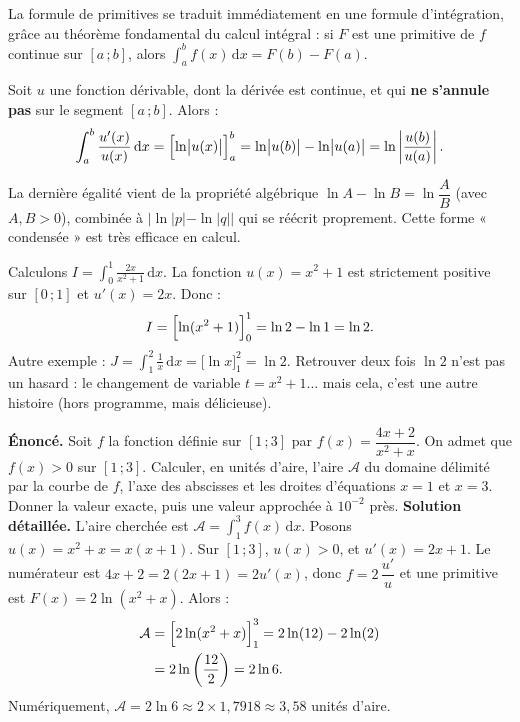 \documentclass[11pt]{article}
\newcounter{popsec}
\newcounter{popsub}
\newcommand{\courssub}[1]{%
  \stepcounter{popsub}%
  \par\vspace{9pt}\noindent{\popxbold\fontsize{11.5}{13}\selectfont\color{popink}{\color{poporange}\thepopsec.\thepopsub}\hspace{6pt}#1}\par\nopagebreak\vspace{4pt}
}
\begin{document}
\courssub{Lien avec le calcul intégral}

La formule de primitives se traduit immédiatement en une formule d'intégration, grâce au théorème fondamental du calcul intégral : si $F$ est une primitive de $f$ continue sur $[a\,;b]$, alors $\displaystyle\int_a^b f(x)\,\mathrm{d}x = F(b) - F(a)$.

\begin{propriete}[Intégrale de $u'/u$]
Soit $u$ une fonction dérivable, dont la dérivée est continue, et qui \textbf{ne s'annule pas} sur le segment $[a\,;b]$. Alors :
\[ \int_a^b \frac{u'(x)}{u(x)}\,\mathrm{d}x = \Bigl[\ln\bigl|u(x)\bigr|\Bigr]_a^b = \ln\bigl|u(b)\bigr| - \ln\bigl|u(a)\bigr| = \ln\left|\frac{u(b)}{u(a)}\right|. \]
\end{propriete}

La dernière égalité vient de la propriété algébrique $\ln A - \ln B = \ln\dfrac{A}{B}$ (avec $A, B > 0$), combinée à $|\ln|p| - \ln|q||$ qui se réécrit proprement. Cette forme « condensée » est très efficace en calcul.

\begin{exemplebox}
Calculons $I = \displaystyle\int_0^1 \frac{2x}{x^2 + 1}\,\mathrm{d}x$.
La fonction $u(x) = x^2 + 1$ est strictement positive sur $[0\,;1]$ et $u'(x) = 2x$. Donc :
\[ I = \Bigl[\ln(x^2+1)\Bigr]_0^1 = \ln 2 - \ln 1 = \ln 2. \]
Autre exemple : $J = \displaystyle\int_1^2 \frac{1}{x}\,\mathrm{d}x = \bigl[\ln x\bigr]_1^2 = \ln 2$. Retrouver deux fois $\ln 2$ n'est pas un hasard : le changement de variable $t = x^2 + 1$... mais cela, c'est une autre histoire (hors programme, mais délicieuse).
\end{exemplebox}

\begin{exoresolu}
\textbf{Énoncé.} Soit $f$ la fonction définie sur $[1\,;3]$ par $f(x) = \dfrac{4x + 2}{x^2 + x}$. On admet que $f(x) > 0$ sur $[1\,;3]$. Calculer, en unités d'aire, l'aire $\mathcal{A}$ du domaine délimité par la courbe de $f$, l'axe des abscisses et les droites d'équations $x = 1$ et $x = 3$. Donner la valeur exacte, puis une valeur approchée à $10^{-2}$ près.
\tcblower
\textbf{Solution détaillée.} L'aire cherchée est $\mathcal{A} = \displaystyle\int_1^3 f(x)\,\mathrm{d}x$.
Posons $u(x) = x^2 + x = x(x+1)$. Sur $[1\,;3]$, $u(x) > 0$, et $u'(x) = 2x + 1$. Le numérateur est $4x + 2 = 2(2x+1) = 2u'(x)$, donc $f = 2\,\dfrac{u'}{u}$ et une primitive est $F(x) = 2\ln(x^2+x)$. Alors :
\begin{align*}
\mathcal{A} &= \Bigl[2\ln(x^2+x)\Bigr]_1^3 = 2\ln(12) - 2\ln(2) \\
&= 2\ln\left(\frac{12}{2}\right) = 2\ln 6.
\end{align*}
Numériquement, $\mathcal{A} = 2\ln 6 \approx 2 \times 1{,}7918 \approx 3{,}58$ unités d'aire.
\end{exoresolu}
\end{document}
